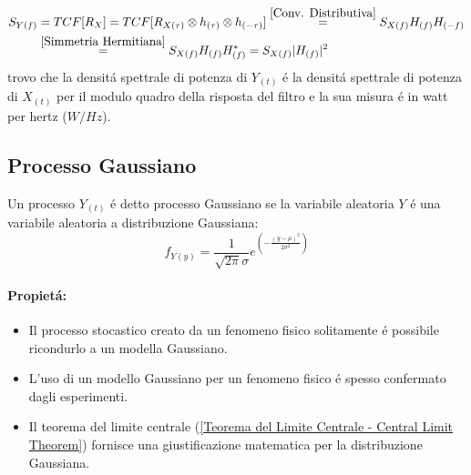             \begin{align}
                S_{Y(f)} &= TCF[R_X] =TCF[ R_{X(\tau)}\otimes h_{(\tau)} \otimes h_{(-\tau)}] \overset{\ref{Conv. Distributiva}}{=}  S_{X(f)}H_{(f)} H_{(-f)}    \nonumber \\
                         &\overset{\ref{Simmetria Hermitiana}}{=} S_{X(f)}H_{(f)} H^\ast_{(f)} =  S_{X(f)}|H_{(f)}|^2\nonumber
            \end{align}
            trovo che la densitá spettrale di potenza di $Y_{(t)}$ é la densitá spettrale di potenza di $X_{(t)}$ per il modulo quadro della
            risposta del filtro e la sua misura é in watt per hertz ($W/Hz$).
    \subsection{Processo Gaussiano}
        Un processo $Y_{(t)}$ é detto processo Gaussiano se la variabile aleatoria $Y$ é una variabile aleatoria a distribuzione Gaussiana:
        \[
            f_{Y(y)} = \frac{1}{\sqrt{2\pi}\sigma}e^{\left(\displaystyle-\frac{(y-\mu)^2}{2\sigma^2}\right)}    
        \] 
        \paragraph{Propietá:}
        \begin{itemize}
            \item {
                Il processo stocastico creato da un fenomeno fisico solitamente é possibile ricondurlo a un modella Gaussiano.
            }
            \item {
                L'uso di un modello Gaussiano per un fenomeno fisico é spesso confermato dagli esperimenti.
            }
            \item {
                Il teorema del limite centrale (\ref{Teorema del Limite Centrale - Central Limit Theorem}) fornisce una giustificazione matematica per la 
                distribuzione Gaussiana.
            }
        \end{itemize}
